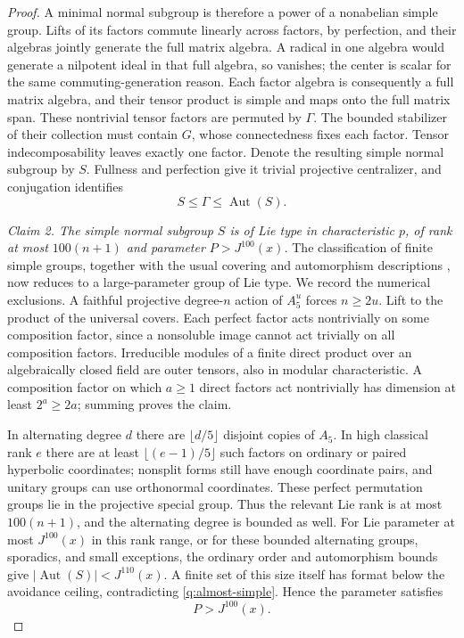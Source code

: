 \begin{proof}
A minimal normal subgroup is therefore a power of a nonabelian simple
group.  Lifts of its factors commute linearly across factors, by
perfection, and their algebras jointly generate the full matrix algebra.
A radical in one algebra would generate a nilpotent ideal in that full
algebra, so vanishes; the center is scalar for the same commuting-generation
reason.  Each factor algebra is consequently a full matrix algebra, and
their tensor product is simple and maps onto the full matrix span.  These
nontrivial tensor factors are permuted by $\Gamma$.  The bounded stabilizer
of their collection must contain $G$, whose connectedness fixes each
factor.  Tensor indecomposability leaves exactly one factor.  Denote the
resulting simple normal subgroup by $S$.  Fullness and perfection give it
trivial projective centralizer, and conjugation identifies
\begin{equation}\label{q:almost-simple}
                       S\le\Gamma\le\operatorname{Aut}(S).
\end{equation}

\emph{Claim 2. The simple normal subgroup $S$ is of Lie type in
characteristic $p$, of rank at most $100(n+1)$ and parameter
$P>J^{100}(x)$.}
The classification of finite simple groups, together with the usual
covering and automorphism descriptions \cite{GLS1994}, now reduces to a
large-parameter group of Lie type.  We record the numerical exclusions.
A faithful projective degree-$n$ action of $A_5^u$ forces $n\ge2u$.  Lift to the
product of the universal covers.  Each perfect factor acts nontrivially on
some composition factor, since a nonsoluble image cannot act trivially on
all composition factors.  Irreducible modules of a finite direct product
over an algebraically closed field are outer tensors, also in modular
characteristic.  A composition factor on which $a\ge1$ direct factors act
nontrivially has dimension at least $2^a\ge2a$; summing proves the claim.

In alternating degree $d$ there are $\lfloor d/5\rfloor$ disjoint copies
of $A_5$.  In high classical rank $e$ there are at least
$\lfloor(e-1)/5\rfloor$ such factors on ordinary or paired hyperbolic
coordinates; nonsplit forms still have enough coordinate pairs, and
unitary groups can use orthonormal coordinates.  These perfect permutation
groups lie in the projective special group.  Thus the relevant Lie rank
is at most $100(n+1)$, and the alternating degree is bounded as well.
For Lie parameter at most $J^{100}(x)$ in this rank range, or for these
bounded alternating groups, sporadics, and small exceptions, the ordinary
order and automorphism bounds give
$|\operatorname{Aut}(S)|<J^{110}(x)$.  A finite set of this size itself
has format below the avoidance ceiling, contradicting
\eqref{q:almost-simple}.  Hence the parameter satisfies
\begin{equation}\label{q:large-parameter}
                         P>J^{100}(x).
\end{equation}


\end{proof}
